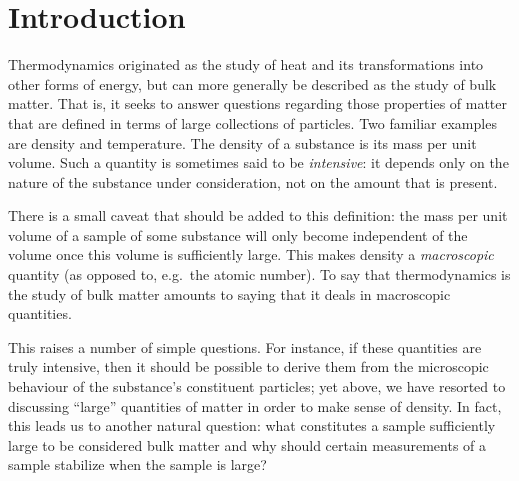 \chapter{Introduction}
\label{sec:intro}

\setcounter{footnote}{0}


Thermodynamics originated as the study of heat and its transformations into other
forms of energy, but can more generally be described as the study of bulk matter.
That is, it seeks to answer questions regarding those properties of matter that
are defined in terms of large collections of particles. Two
familiar examples are density and temperature. The density of a substance is
its mass per unit volume.
Such a quantity is sometimes said to be \emph{intensive}: it depends only on
the nature of the substance under consideration, not on the amount that is present.

There is a small caveat that should be added to this definition: the mass per unit
volume of a sample of some substance will only become independent of the volume once
this volume is sufficiently large. This makes density a \emph{macroscopic} quantity
(as opposed to, e.g.\ the atomic number). To say that thermodynamics is the study
of bulk matter amounts to saying that it deals in macroscopic quantities.

This raises a number of simple questions. For instance, if these quantities
are truly intensive, then it should be possible to 
derive them from the microscopic behaviour of the substance's constituent particles;
yet above, we have resorted to discussing ``large'' quantities of matter in order
to make sense of density. In fact, this leads us to another natural question: what
constitutes a sample sufficiently large to be considered bulk matter and why should
certain measurements of a sample stabilize when the sample is large?

